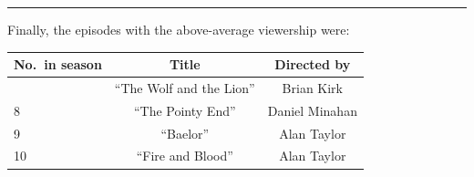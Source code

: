 \documentclass[
  letterpaper,
  DIV=11,
  numbers=noendperiod]{scrartcl}
\begin{document}
\begin{center}\rule{0.5\linewidth}{0.5pt}\end{center}

Finally, the episodes with the above-average viewership were:

\begin{longtable}[]{@{}lcc@{}}
\toprule\noalign{}
No.~in season & Title & Directed by \\
\midrule\noalign{}
\endhead
\bottomrule\noalign{}
\endlastfoot
5 & ``The Wolf and the Lion'' & Brian Kirk \\
8 & ``The Pointy End'' & Daniel Minahan \\
9 & ``Baelor'' & Alan Taylor \\
10 & ``Fire and Blood'' & Alan Taylor \\
\end{longtable}
\end{document}

